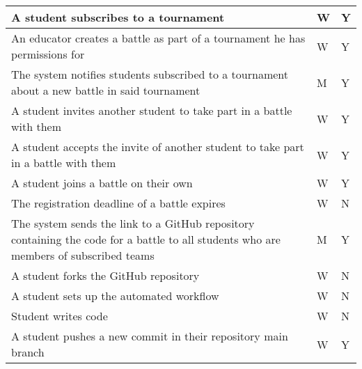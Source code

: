 \begin{center}
\begin{longtable}{|p{8.7cm}|p{3cm}|p{3cm}|}
        A student subscribes to a tournament                                                                                                  & W                      & Y               \\ \hline
        An educator creates a battle as part of a tournament he has permissions for                                                           & W                      & Y               \\ \hline
        The system notifies students subscribed to a tournament about a new battle in said tournament                                         & M                      & Y               \\ \hline
        A student invites another student to take part in a battle with them                                                                  & W                      & Y               \\ \hline
        A student accepts the invite of another student to take part in a battle with them                                                    & W                      & Y               \\ \hline
        A student joins a battle on their own                                                                                                 & W                      & Y               \\ \hline
        The registration deadline of a battle expires                                                                                         & W                      & N               \\ \hline
        The system sends the link to a GitHub repository containing the code for a battle to all students who are members of subscribed teams & M                      & Y               \\ \hline
        A student forks the GitHub repository                                                                                                 & W                      & N               \\ \hline
        A student sets up the automated workflow                                                                                              & W                      & N               \\ \hline
        Student writes code                                                                                                                   & W                      & N               \\ \hline
        A student pushes a new commit in their repository main branch                                                                         & W                      & Y               \\ \hline

\end{longtable}
\end{center}
